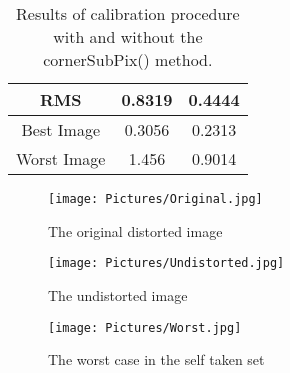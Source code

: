 \documentclass[11pt,a4paper]{article}
\newcommand{\cc}{\fontfamily{txtt}\selectfont}
\begin{document}
\begin{center}
\begin{table}[ht]
\begin{tabular}{|c | c c|}
     \hline
     RMS & 0.8319& 0.4444\\
     \hline
     Best Image &   0.3056 & 0.2313\\
     \hline
     Worst Image &  1.456& 0.9014\\
     \hline
    \end{tabular}    
  \caption{Results of calibration procedure with and without the {\cc cornerSubPix()} method.}
  \label{Table:values}
  \end{table}
  \begin{figure}[ht]
    \texttt{[image: Pictures/Original.jpg]}
    \caption{The original distorted image}
  \end{figure}  
  \begin{figure}[ht]
    \texttt{[image: Pictures/Undistorted.jpg]}
    \caption{The undistorted image}
  \end{figure}
  \begin{figure}[ht]
    \texttt{[image: Pictures/Worst.jpg]}
    \caption{The worst case in the self taken set}
  \end{figure}
\end{center}
\end{document}
